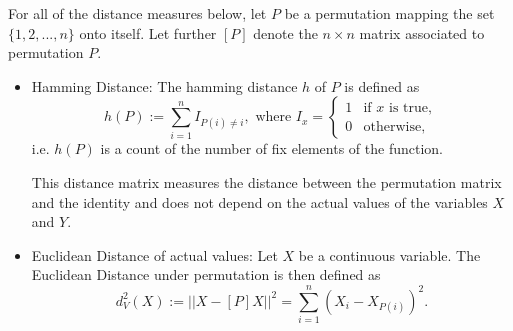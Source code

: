 For all of the distance measures below, let $P$ be a permutation mapping  the set $\{1, 2, ..., n\}$ onto itself. Let further $[P]$ denote the $n \times n$ matrix associated to permutation $P$.

\begin{itemize}

\item Hamming Distance: The hamming distance $h$ of $P$ is defined as 
\[
h(P) := \sum_{i=1}^n I_{P(i) \neq i},  \text{ where } I_{x} = \left \{ 
\begin{array}{ll}
1 & \text{if } x \text{ is true},\\
0 & \text{otherwise},
\end{array} \right.
\]
i.e. $h(P)$ is a count of the number of fix elements of the function.




This distance matrix measures the distance between the permutation matrix and the identity and does not depend on the actual values of the variables $X$ and $Y$. 




\item Euclidean Distance of actual values: 
Let $X$ be a continuous variable. The Euclidean Distance under permutation is then defined as 
\[
d^2_V(X) := || X - [P]X||^2 = \sum_{i=1}^n (X_i - X_{P(i)})^2.
\]







\end{itemize}
